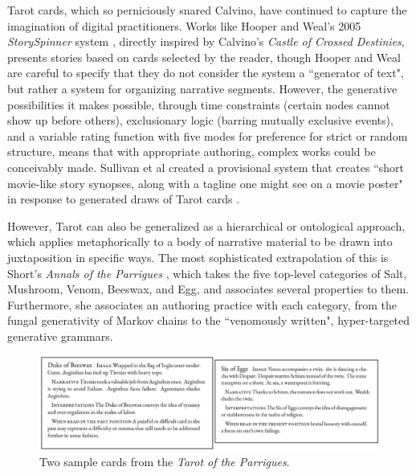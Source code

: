 Tarot cards, which so perniciously snared Calvino, have continued to capture the imagination of digital practitioners. Works like Hooper and Weal's 2005 \textit{StorySpinner} system \cite{storyspinner}, directly inspired by Calvino's \textit{Castle of Crossed Destinies}, presents stories based on cards selected by the reader, though Hooper and Weal are careful to specify that they do not consider the system a ``generator of text", but rather a system for organizing narrative segments. However, the generative possibilities it makes possible, through time constraints (certain nodes cannot show up before others), exclusionary logic (barring mutually exclusive events), and a variable rating function with five modes for preference for strict or random structure, means that with appropriate authoring, complex works could be conceivably made. Sullivan et al created a provisional system that creates ``short movie-like story synopses, along with a tagline one might see on a movie poster" in response to generated draws of Tarot cards \cite{sullivan2018tarot}.

However, Tarot can also be generalized as a hierarchical or ontological approach, which applies metaphorically to a body of narrative material to be drawn into juxtaposition in specific ways. The most sophisticated extrapolation of this is Short's \textit{Annals of the Parrigues} \cite{short_annals}, which takes the five top-level categories of Salt, Mushroom, Venom, Beeswax, and Egg, and associates several properties to them. Furthermore, she associates an authoring practice with each category, from the fungal generativity of Markov chains to the ``venomously written", hyper-targeted generative grammars. 


\begin{figure}
    \centering
    \includegraphics[width=\textwidth]{figures/2-Ice-Bound/parrigues.jpg}
    \caption{Two sample cards from the \textit{Tarot of the Parrigues}.}
    \label{fig:parrigues}
\end{figure}


